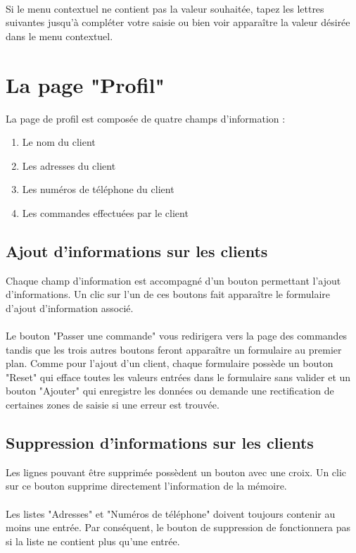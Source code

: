 \paragraph{}
Si le menu contextuel ne contient pas la valeur souhaitée, tapez les lettres
suivantes jusqu'à compléter votre saisie ou bien voir apparaître la valeur
désirée dans le menu contextuel.

\section{La page "Profil"}
La page de profil est composée de quatre champs d'information :

\begin{enumerate}
  \item Le nom du client
  \item Les adresses du client
  \item Les numéros de téléphone du client
  \item Les commandes effectuées par le client
\end{enumerate}

\subsection{Ajout d'informations sur les clients}
Chaque champ d'information est accompagné d'un bouton permettant l'ajout d'informations.
Un clic sur l'un de ces boutons fait apparaître le formulaire d'ajout
d'information associé.

\paragraph{}
Le bouton "Passer une commande" vous redirigera vers la page des commandes
tandis que les trois autres boutons feront apparaître un formulaire au premier
plan. Comme pour l'ajout d'un client, chaque formulaire possède un bouton "Reset"
qui efface toutes les valeurs entrées dans le formulaire sans valider et un
bouton "Ajouter" qui enregistre les données ou demande une rectification de
certaines zones de saisie si une erreur est trouvée.

\subsection{Suppression d'informations sur les clients}
Les lignes pouvant être supprimée possèdent
un bouton avec une croix. Un clic sur ce bouton supprime directement
l'information de la mémoire.

\paragraph{}
Les listes "Adresses" et "Numéros de téléphone" doivent toujours contenir au
moins une entrée. Par conséquent, le bouton de suppression de fonctionnera pas
si la liste ne contient plus qu'une entrée.
